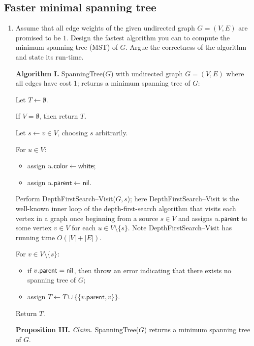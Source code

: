 \subsection{Faster minimal spanning tree}
\begin{enumerate}
\item Assume that all edge weights of the given undirected graph $G = (V, E)$ are promised to be $1$. Design the fastest algorithm you can to compute the minimum spanning tree (MST) of $G$. Argue the correctness of the algorithm and state its run-time.
\begin{solution}

\textbf{Algorithm I. }{\sc SpanningTree}($G$) with undirected graph $G=(V,E)$ where all edges have cost 1; returns a minimum spanning tree of $G$:

Let $T\leftarrow\emptyset$.

If $V=\emptyset$, then return $T$.

Let $s\leftarrow v\in V$, choosing $s$ arbitrarily.

For $u\in V$:
\begin{itemize}
    \item assign $u.\mathsf{color}\leftarrow\mathsf{white}$;
    \item assign $u.\mathsf{parent}\leftarrow\mathsf{nil}$.
\end{itemize}

Perform {\sc DepthFirstSearch--Visit}($G,s$); here {\sc DepthFirstSearch--Visit} is the well-known inner loop of the depth-first-search algorithm that visits each vertex in a graph once beginning from a source $s\in V$ and assigns $u.\mathsf{parent}$ to some vertex $v\in V$ for each $u\in V\setminus\{s\}$. Note {\sc DepthFirstSearch--Visit} has running time $O(|V|+|E|)$.

For $v\in V\setminus\{s\}$:
\begin{itemize}
\item if $v.\mathsf{parent}=\sf{nil}$, then throw an error indicating that there exists no spanning tree of $G$;
\item assign $T\leftarrow T\cup\{\{v.\mathsf{parent},v\}\}$.
\end{itemize}

Return $T$.

\textbf{Proposition III. }\textit{Claim. }{\sc SpanningTree}($G$) returns a minimum spanning tree of $G$.


\end{solution}
\end{enumerate}
